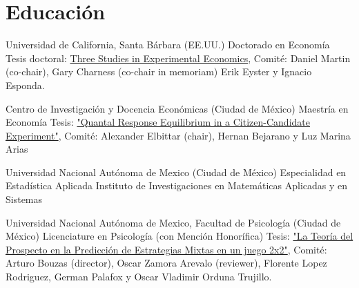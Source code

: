\section{Educación}

{Universidad de California, Santa Bárbara (EE.UU.)}
{Doctorado en Economía}
{}{}
{Tesis doctoral: \href{https://escholarship.org/uc/item/8fj0g1tg}{Three Studies in Experimental Economics}, 
	Comité:
	Daniel Martin (co-chair),
	Gary Charness (co-chair in memoriam)
	Erik Eyster y
	Ignacio Esponda.
}

{Centro de Investigación y Docencia Económicas (Ciudad de México)}
{Maestría en Economía}
{}{}
{Tesis: \href{http://repositorio-digital.cide.edu/handle/11651/1719?show=full}{"Quantal Response Equilibrium in a Citizen-Candidate Experiment"}, 
	Comité: Alexander Elbittar (chair), Hernan Bejarano y Luz Marina Arias}

{Universidad Nacional Autónoma de Mexico (Ciudad de México)}
{Especialidad en Estadística Aplicada}
{}{}
{Instituto de Investigaciones en Matemáticas Aplicadas y en Sistemas }

{Universidad Nacional Autónoma de Mexico, Facultad de Psicología (Ciudad de México)}
{Licenciature en Psicología (con Mención Honorífica)}
{}{}
{Tesis: \href{http://132.248.9.195/ptd2013/noviembre/0706151/Index.html}{"La Teoría del Prospecto en la Predicción de Estrategias Mixtas en un juego 2x2"}, 
	Comité: Arturo Bouzas (director), Oscar Zamora Arevalo (reviewer), Florente Lopez Rodriguez, German Palafox y Oscar Vladimir Orduna Trujillo.} %






